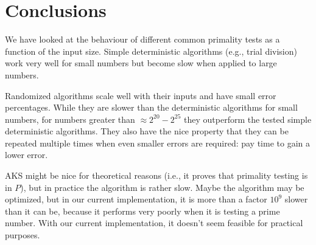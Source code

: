 \section{Conclusions}


We have looked at the behaviour of different common primality tests as a function of the input size.
Simple deterministic algorithms (e.g., trial division) work very well for small numbers but become slow when applied to large numbers.

Randomized algorithms scale well with their inputs and have small error percentages.
While they are slower than the deterministic algorithms for small numbers,
for numbers greater than $\approx 2^{20}-2^{25}$ they outperform the tested simple deterministic algorithms.
They also have the nice property that they can be repeated multiple times when even smaller errors are required: pay time to gain a lower error.

AKS might be nice for theoretical reasons (i.e., it proves that primality testing is in $P$), but in practice the algorithm is rather slow.
Maybe the algorithm may be optimized, but in our current implementation, it is more than a factor $10^9$ slower than it can be,
because it performs very poorly when it is testing a prime number.
With our current implementation, it doesn't seem feasible for practical purposes.
